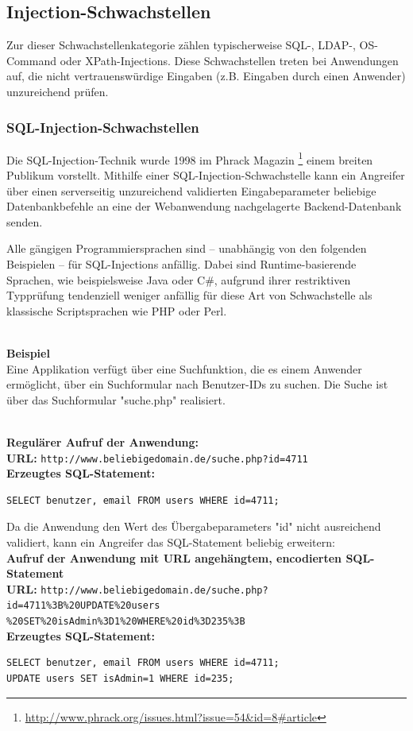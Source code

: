 \subsection{Injection-Schwachstellen}

Zur dieser Schwachstellenkategorie zählen typischerweise SQL-, LDAP-, 
OS-Command oder XPath-Injections. Diese Schwachstellen treten bei 
Anwendungen auf, die nicht vertrauenswürdige Eingaben 
(z.B. Eingaben durch einen Anwender) unzureichend prüfen.


\subsubsection{SQL-Injection-Schwachstellen}

Die SQL-Injection-Technik wurde 1998 im Phrack Magazin
\footnote{\url{http://www.phrack.org/issues.html?issue=54\&id=8\#article}} 
einem breiten Publikum vorstellt. Mithilfe einer SQL-Injection-Schwachstelle 
kann ein Angreifer über einen serverseitig unzureichend 
validierten Eingabeparameter beliebige Datenbankbefehle an eine der 
Webanwendung nachgelagerte Backend-Datenbank senden.

Alle gängigen Programmiersprachen sind – unabhängig von den folgenden 
Beispielen – für SQL-Injections anfällig. Dabei sind Runtime-basierende 
Sprachen, wie beispielsweise Java oder C\#, aufgrund ihrer  restriktiven 
Typprüfung tendenziell weniger anfällig für diese Art von Schwachstelle 
als klassische Scriptsprachen wie PHP oder Perl.

\\
\textbf{Beispiel}
\\
Eine Applikation verfügt über eine Suchfunktion, die es einem Anwender 
ermöglicht, über ein Suchformular nach Benutzer-IDs zu suchen. 
Die Suche ist über das Suchformular "suche.php" realisiert.

\\
\textbf{Regulärer Aufruf der Anwendung:}
\\
\textbf{URL:} \texttt{http://www.beliebigedomain.de/suche.php?id=4711}
\\
\textbf{Erzeugtes SQL-Statement:}
\begin{lstlisting}[basicstyle=\ttfamily\footnotesize]
SELECT benutzer, email FROM users WHERE id=4711;
\end{lstlisting}
Da die Anwendung den Wert des Übergabeparameters "id" nicht ausreichend validiert, kann ein Angreifer das SQL-Statement beliebig erweitern:
\\
\textbf{Aufruf der Anwendung mit URL angehängtem, encodierten SQL-Statement}
\\
\textbf{URL:} \texttt{http://www.beliebigedomain.de/suche.php?id=4711\%3B\%20UPDATE\%20users\\\%20SET\%20isAdmin\%3D1\%20WHERE\%20id\%3D235\%3B}
\\
\textbf{Erzeugtes SQL-Statement:}
\begin{lstlisting}[basicstyle=\ttfamily\footnotesize]
SELECT benutzer, email FROM users WHERE id=4711; 
UPDATE users SET isAdmin=1 WHERE id=235;
\end{lstlisting}


